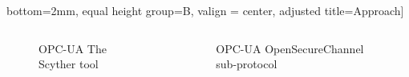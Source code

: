 \documentclass{beamer}
\newcommand{\opcua}{OPC-UA\xspace}
\begin{document}
\begin{frame}[fragile]{}
\begin{tcolorbox}[adjusted title={\centering\large Formal Analysis of Industrial Protocols}]
\begin{columns}[T]
\begin{column}{.65\textwidth}
\begin{tcolorbox}
                bottom=2mm,
                equal height group=B,
                valign = center,
                adjusted title={\large Approach}]
                    \begin{columns}[c]
                        \begin{column}{.45\textwidth}
                            \begin{figure}[htb]
                                \vspace{-1.25em}
                                \caption{\opcua The Scyther tool}
                            \end{figure}
                        \end{column}
                        \begin{column}{.55\textwidth}
                            \begin{figure}[htb]
                                \vspace{-1.25em}
                                \caption{\opcua OpenSecureChannel sub-protocol}
                            \end{figure}
                        \end{column}
                    \end{columns}

\end{tcolorbox}
\end{column}
\end{columns}
\end{tcolorbox}
\end{frame}
\end{document}
